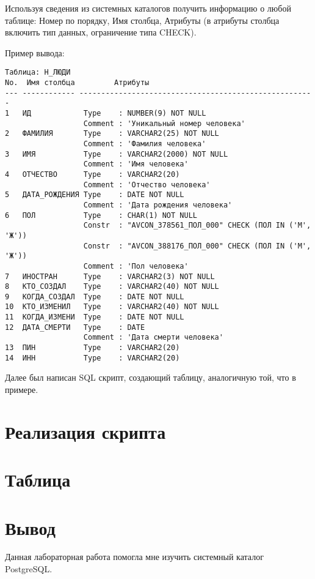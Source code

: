 \documentclass{article}
\begin{document}
Используя сведения из системных каталогов получить информацию о любой таблице: Номер по порядку, Имя столбца, Атрибуты (в атрибуты столбца включить тип данных, ограничение типа CHECK).

Пример вывода:
\begin{verbatim}
Таблица: Н_ЛЮДИ
No.  Имя столбца         Атрибуты
--- ------------ ------------------------------------------------------
1   ИД            Type    : NUMBER(9) NOT NULL
                  Comment : 'Уникальный номер человека'
2   ФАМИЛИЯ       Type    : VARCHAR2(25) NOT NULL
                  Comment : 'Фамилия человека'
3   ИМЯ           Type    : VARCHAR2(2000) NOT NULL
                  Comment : 'Имя человека'
4   ОТЧЕСТВО      Type    : VARCHAR2(20)  
                  Comment : 'Отчество человека'
5   ДАТА_РОЖДЕНИЯ Type    : DATE NOT NULL
                  Comment : 'Дата рождения человека'
6   ПОЛ           Type    : CHAR(1) NOT NULL
                  Constr  : "AVCON_378561_ПОЛ_000" CHECK (ПОЛ IN ('М', 'Ж'))
                  Constr  : "AVCON_388176_ПОЛ_000" CHECK (ПОЛ IN ('М', 'Ж'))
                  Comment : 'Пол человека'
7   ИНОСТРАН      Type    : VARCHAR2(3) NOT NULL
8   КТО_СОЗДАЛ    Type    : VARCHAR2(40) NOT NULL
9   КОГДА_СОЗДАЛ  Type    : DATE NOT NULL
10  КТО_ИЗМЕНИЛ   Type    : VARCHAR2(40) NOT NULL
11  КОГДА_ИЗМЕНИ  Type    : DATE NOT NULL
12  ДАТА_СМЕРТИ   Type    : DATE  
                  Comment : 'Дата смерти человека'
13  ПИН           Type    : VARCHAR2(20)  
14  ИНН           Type    : VARCHAR2(20)  
\end{verbatim}

Далее был написан SQL скрипт, создающий таблицу, аналогичную той, что в примере.



\section{Реализация скрипта}





\section{Таблица}



\section{Вывод}

Данная лабораторная работа помогла мне изучить системный каталог PostgreSQL.

\begin{thebibliography}{9}

\end{thebibliography}
\end{document}
